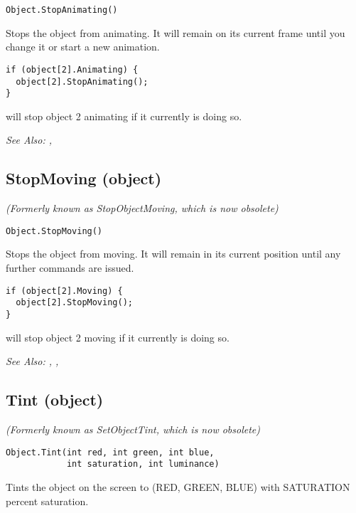 \begin{verbatim}
Object.StopAnimating()
\end{verbatim}
Stops the object from animating. It will remain on its current frame until you change it
or start a new animation.

\begin{verbatim}
if (object[2].Animating) {
  object[2].StopAnimating();
}
\end{verbatim}
will stop object 2 animating if it currently is doing so.

\it{See Also:} ,


\subsection{StopMoving (object)}\label{Object.StopMoving}%

\it{(Formerly known as StopObjectMoving, which is now obsolete)}

\begin{verbatim}
Object.StopMoving()
\end{verbatim}
Stops the object from moving. It will remain in its current position
until any further commands are issued.

\begin{verbatim}
if (object[2].Moving) {
  object[2].StopMoving();
}
\end{verbatim}
will stop object 2 moving if it currently is doing so.

\it{See Also:} , ,


\subsection{Tint (object)}\label{Object.Tint}%

\it{(Formerly known as SetObjectTint, which is now obsolete)}

\begin{verbatim}
Object.Tint(int red, int green, int blue,
            int saturation, int luminance)
\end{verbatim}

Tints the object on the screen to (RED, GREEN, BLUE) with SATURATION percent
saturation.

